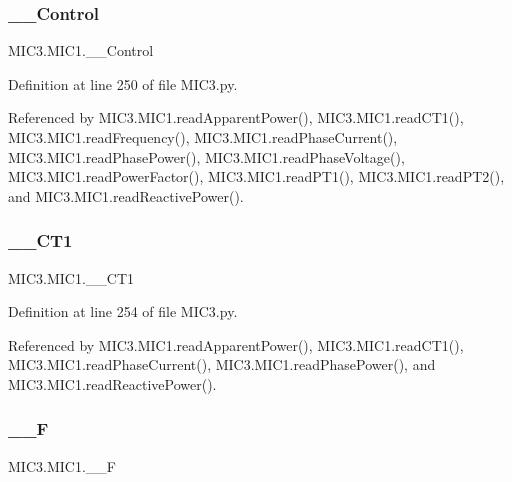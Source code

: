 \subsubsection{\texorpdfstring{\+\_\+\+\_\+\+Control}{\_\_Control}}
{\footnotesize\ttfamily M\+I\+C3.\+M\+I\+C1.\+\_\+\+\_\+\+Control\hspace{0.3cm}{\ttfamily [private]}}



Definition at line 250 of file M\+I\+C3.\+py.



Referenced by M\+I\+C3.\+M\+I\+C1.\+read\+Apparent\+Power(), M\+I\+C3.\+M\+I\+C1.\+read\+C\+T1(), M\+I\+C3.\+M\+I\+C1.\+read\+Frequency(), M\+I\+C3.\+M\+I\+C1.\+read\+Phase\+Current(), M\+I\+C3.\+M\+I\+C1.\+read\+Phase\+Power(), M\+I\+C3.\+M\+I\+C1.\+read\+Phase\+Voltage(), M\+I\+C3.\+M\+I\+C1.\+read\+Power\+Factor(), M\+I\+C3.\+M\+I\+C1.\+read\+P\+T1(), M\+I\+C3.\+M\+I\+C1.\+read\+P\+T2(), and M\+I\+C3.\+M\+I\+C1.\+read\+Reactive\+Power().

\mbox{\label{class_m_i_c3_1_1_m_i_c1_aaa1e6791e5fb9881e4c0bb7fdba94a1f}} 
\subsubsection{\texorpdfstring{\+\_\+\+\_\+\+C\+T1}{\_\_CT1}}
{\footnotesize\ttfamily M\+I\+C3.\+M\+I\+C1.\+\_\+\+\_\+\+C\+T1\hspace{0.3cm}{\ttfamily [private]}}



Definition at line 254 of file M\+I\+C3.\+py.



Referenced by M\+I\+C3.\+M\+I\+C1.\+read\+Apparent\+Power(), M\+I\+C3.\+M\+I\+C1.\+read\+C\+T1(), M\+I\+C3.\+M\+I\+C1.\+read\+Phase\+Current(), M\+I\+C3.\+M\+I\+C1.\+read\+Phase\+Power(), and M\+I\+C3.\+M\+I\+C1.\+read\+Reactive\+Power().

\mbox{\label{class_m_i_c3_1_1_m_i_c1_ac24e1bb43a234d3545bd9dea897ee7f8}} 
\subsubsection{\texorpdfstring{\+\_\+\+\_\+F}{\_\_F}}
{\footnotesize\ttfamily M\+I\+C3.\+M\+I\+C1.\+\_\+\+\_\+F\hspace{0.3cm}{\ttfamily [private]}}



